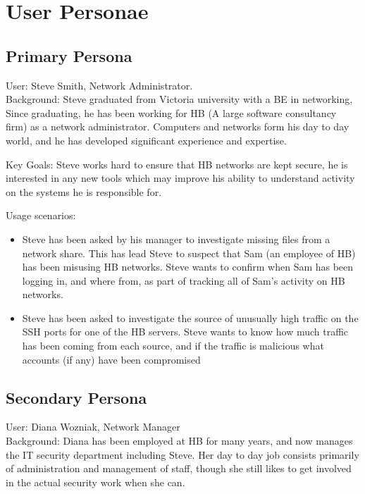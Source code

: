 \chapter{User Personae}\label{append_personae}

\section{Primary Persona}
User: Steve Smith, Network Administrator. \\

Background:  Steve graduated from Victoria university with a BE in networking, Since graduating, he has been working for HB (A large software consultancy firm) as a network administrator. Computers and networks form his day to day world, and he has developed significant experience and expertise. 

Key Goals: Steve works hard to ensure that HB networks are kept secure, he is interested in any new tools which may improve his ability to understand activity on the systems he is responsible for. 

Usage scenarios:
\begin{itemize}
\item{Steve has been asked by his manager to investigate missing files from a network share. This has lead Steve to suspect that Sam (an employee of HB) has been misusing HB networks. Steve wants to confirm when Sam has been logging in, and where from, as part of tracking all of Sam's activity on HB networks.}
\item{Steve has been asked to investigate the source of unusually high traffic on the SSH ports for one of the HB servers. Steve wants to know how much traffic has been coming from each source, and if the traffic is malicious what accounts (if any) have been compromised}
\end{itemize}


\section{Secondary Persona}

User: Diana Wozniak, Network Manager \\

Background:  Diana has been employed at HB for many years, and now manages the IT security department including Steve. Her day to day job consists primarily of administration and management of staff, though she still likes to get involved in the actual security work when she can. 

